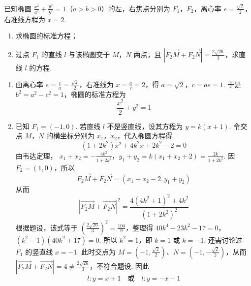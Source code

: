 \begin{problem}
已知椭圆 \(\frac{x^2}{a^2} + \frac{y^2}{b^2} = 1\)（\(a > b > 0\)）的左，右焦点分别为 \(F_1\)，\(F_2\)，离心率 \(e = \frac{\sqrt{2}}{2}\)，右准线方程为 \(x = 2\).

\begin{enumerate}
\item 求椭圆的标准方程；
\item 过点 \(F_{1}\) 的直线 \(l\) 与该椭圆交于 \(M\)，\(N\) 两点，且 \(\left|\overrightarrow{F_2M} + \overrightarrow{F_2N}\right| = \frac{2\sqrt{26}}{3}\)，求直线 \(l\) 的方程.
\end{enumerate}
\begin{solution}
\begin{enumerate}
\item 由离心率 \(e=\frac ca=\frac{\sqrt2}{2}\)，右准线为
\(x=\frac ae=2\)，得 \(a=\sqrt2\)，\(c=ae=1\). 于是
\(b^2=a^2-c^2=1\)，椭圆的标准方程为
\[
\frac{x^2}{2}+y^2=1
\]

\item 已知 \(F_1=(-1,0)\). 若直线 \(l\) 不是竖直线，设其方程为
\(y=k(x+1)\). 令交点 \(M\)，\(N\) 的横坐标分别为 \(x_1\)，\(x_2\)，代入椭圆方程得
\[
(1+2k^2)x^2+4k^2x+2k^2-2=0
\]
由韦达定理，
\(x_1+x_2=-\frac{4k^2}{1+2k^2}\)，\(y_1+y_2=k(x_1+x_2+2)=\frac{2k}{1+2k^2}\).
因 \(F_2=(1,0)\)，所以
\[
\overrightarrow{F_2M}+\overrightarrow{F_2N}
=\left(x_1+x_2-2,y_1+y_2\right)
\]
从而
\[
\left|\overrightarrow{F_2M}+\overrightarrow{F_2N}\right|^2
=\frac{4(4k^2+1)^2+4k^2}{(1+2k^2)^2}
\]
根据题设，该式等于 \(\left(\frac{2\sqrt{26}}{3}\right)^2=\frac{104}{9}\)，整理得
\(40k^4-23k^2-17=0\)，\((k^2-1)(40k^2+17)=0\).
所以 \(k^2=1\)，即 \(k=1\) 或 \(k=-1\). 还需讨论过 \(F_1\) 的竖直线
\(x=-1\). 此时交点为
\(M=(-1,\frac{\sqrt2}{2})\)、\(N=(-1,-\frac{\sqrt2}{2})\)，从而
\(\left|\overrightarrow{F_2M}+\overrightarrow{F_2N}\right|=4\ne\frac{2\sqrt{26}}{3}\)，不符合题设.
因此
\[
l:y=x+1\quad\text{或}\quad l:y=-x-1
\]
\end{enumerate}
\end{solution}
\end{problem}

